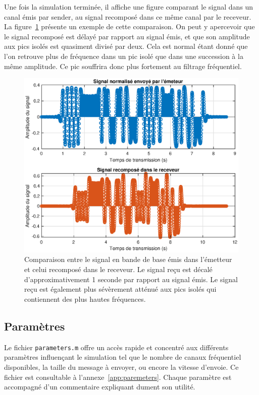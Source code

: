 \documentclass[10pt, oneside, a4paper]{article}
\begin{document}
Une fois la simulation terminée, il affiche une figure comparant le signal dans un canal émis par sender, au signal recomposé dans ce même canal par le receveur.
La figure~\ref{fig:comparaison} présente un exemple de cette comparaison.
On peut y apercevoir que le signal recomposé est délayé par rapport au signal émis, et que son amplitude aux pics isolés est quasiment divisé par deux.
Cela est normal étant donné que l'on retrouve plus de fréquence dans un pic isolé que dans une succession à la même amplitude.
Ce pic souffrira donc plus fortement au filtrage fréquentiel.

\begin{figure}[htbp]
	\includegraphics[width=\textwidth]{eps/comparaison.eps}
	\caption{Comparaison entre le signal en bande de base émis dans l'émetteur et celui
			 recomposé dans le receveur.
			 Le signal reçu est décalé d'approximativement 1 seconde par rapport au signal
			 émis.
			 Le signal reçu est également plus sévèrement atténué aux pics isolés qui
			 contiennent des plus hautes fréquences.}
	\label{fig:comparaison}
\end{figure}

\subsection{Paramètres}
Le fichier \texttt{parameters.m} offre un accès rapide et concentré aux différents paramètres influençant le simulation tel que le nombre de canaux fréquentiel disponibles, la taille du message à envoyer, ou encore la vitesse d'envoie.
Ce fichier est consultable à l'annexe~\ref{app:paremeters}.
Chaque paramètre est accompagné d'un commentaire expliquant dument son utilité.
\end{document}
